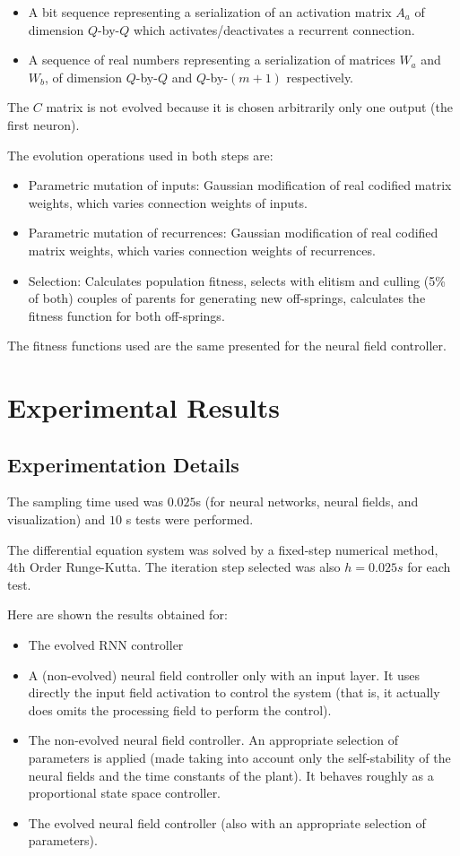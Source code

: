 \begin{itemize}
\item A bit sequence representing a serialization of an activation
  matrix $A_a$ of dimension $Q$-by-$Q$ which activates/deactivates a
  recurrent connection.
\item A sequence of real numbers representing a serialization of
  matrices $W_a$ and $W_b$, of dimension $Q$-by-$Q$ and $Q$-by-$(m+1)$
  respectively.
\end{itemize}

The $C$ matrix is not evolved because it is chosen arbitrarily only
one output (the first neuron).

The evolution operations used in both steps are:
\begin{itemize}
\item Parametric mutation of inputs: Gaussian modification of real
  codified matrix weights, which varies connection weights of inputs.
\item Parametric mutation of recurrences: Gaussian modification of
  real codified matrix weights, which varies connection weights of
  recurrences.
\item Selection: Calculates population fitness, selects with elitism
  and culling (5\% of both) couples of parents for generating new
  off-springs, calculates the fitness function for both off-springs.
\end{itemize}

The fitness functions used are the same presented for the neural field
controller.

\section{Experimental Results}
\subsection*{Experimentation Details}
The sampling time used was $0.025$s (for neural networks, neural
fields, and visualization) and $10$ s tests were performed.

The differential equation system was solved by a fixed-step numerical
method, 4th Order Runge-Kutta. The iteration step selected was also
$h=0.025s$ for each test.

Here are shown the results obtained for:
\begin{itemize}
\item The evolved RNN controller
\item A (non-evolved) neural field controller only with an input
  layer. It uses directly the input field activation to control the
  system (that is, it actually does omits the processing field to
  perform the control).
\item The non-evolved neural field controller. An appropriate
  selection of parameters is applied (made taking into account only
  the self-stability of the neural fields and the time constants of
  the plant). It behaves roughly as a proportional state space
  controller.
\item The evolved neural field controller (also with an appropriate
  selection of parameters).
\end{itemize}

